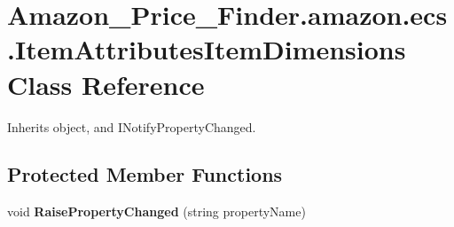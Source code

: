 \hypertarget{class_amazon___price___finder_1_1amazon_1_1ecs_1_1_item_attributes_item_dimensions}{\section{Amazon\-\_\-\-Price\-\_\-\-Finder.\-amazon.\-ecs.\-Item\-Attributes\-Item\-Dimensions Class Reference}
\label{class_amazon___price___finder_1_1amazon_1_1ecs_1_1_item_attributes_item_dimensions}
}


 




Inherits object, and I\-Notify\-Property\-Changed.

\subsection*{Protected Member Functions}
\begin{DoxyCompactItemize}
\item 
\hypertarget{class_amazon___price___finder_1_1amazon_1_1ecs_1_1_item_attributes_item_dimensions_a4953e70c549ef75becd2a25810aa12bf}{void {\bfseries Raise\-Property\-Changed} (string property\-Name)}\label{class_amazon___price___finder_1_1amazon_1_1ecs_1_1_item_attributes_item_dimensions_a4953e70c549ef75becd2a25810aa12bf}

\end{DoxyCompactItemize}
